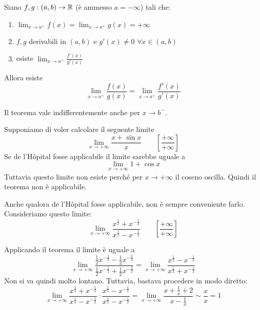 \begin{theorem}
Siano $f, g : (a,b) \to \mathbb R$ (è ammesso $a = -\infty$) tali che:
\begin{enumerate}
\item $\lim_{x \to a^+} f(x) = \lim_{x \to a^+} g(x) = +\infty$
\item $f,g$ derivabili in $(a,b)$ e $g'(x) \neq 0$ $\forall x \in (a,b)$
\item esiste $\lim_{x \to a^+} \frac{f'(x)}{g'(x)}$
\end{enumerate}

Allora esiste
\begin{equation*}
\lim_{x \to a^+} \frac{f(x)}{g(x)} = \lim_{x \to a^+} \frac{f'(x)}{g'(x)}
\end{equation*}
\end{theorem}

\begin{remark}
Il teorema vale indifferentemente anche per $x \to b^-$.
\end{remark}

\begin{example}
Supponiamo di voler calcolare il seguente limite
\begin{equation*}
\lim_{x \to +\infty} \frac{x+\sin x}{x} \qquad \left[\frac{+\infty}{+\infty} \right]
\end{equation*}
Se de l'Hôpital fosse applicabile il limite sarebbe uguale a 
\begin{equation*}
\lim_{x \to +\infty} 1 + \cos x
\end{equation*}
Tuttavia questo limite non esiste perché per $x \to +\infty$ il coseno oscilla. Quindi il teorema non è applicabile.
\end{example}

\begin{example}
Anche qualora de l'Hôpital fosse applicabile, non è sempre conveniente farlo. Consideriamo questo limite:
\begin{equation*}
\lim_{x \to +\infty} \frac{x^\frac{1}{2} + x^{-\frac{1}{2}}}{x^\frac{1}{2} - x^{-\frac{1}{2}}} \qquad \left[\frac{+\infty}{+\infty}\right]
\end{equation*}

Applicando il teorema il limite è uguale a 
\begin{equation*}
\lim_{x \to +\infty} \frac{\frac{1}{2} x^{-\frac{1}{2}} - \frac{1}{2} x^{-\frac{3}{2}}}{\frac{1}{2} x^{-\frac{1}{2}} + \frac{1}{2} x^{-\frac{3}{2}}} = \lim_{x \to +\infty} \frac{x^\frac{1}{2} - x^{-\frac{1}{2}}}{x^\frac{1}{2} + x^{-\frac{1}{2}}}
\end{equation*}
Non si va quindi molto lontano. Tuttavia, bastava procedere in modo diretto:
\begin{equation*}
\lim_{x \to +\infty} \frac{x^\frac{1}{2} + x^{-\frac{1}{2}}}{x^\frac{1}{2} - x^{-\frac{1}{2}}} \cdot \frac{x^\frac{1}{2} - x^{-\frac{1}{2}}}{x^\frac{1}{2} - x^{-\frac{1}{2}}} = \lim_{x \to +\infty} \frac{x + \frac{1}{x} + 2}{x - \frac{1}{x}} \sim \frac{x}{x} = 1
\end{equation*}
\end{example}

